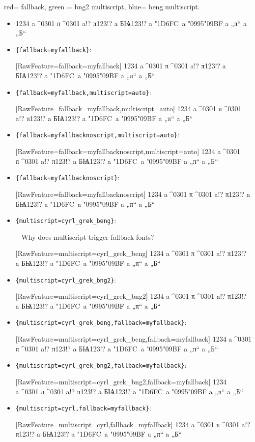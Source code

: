 \documentclass{article}
\newcommand\testtext{1234 a^^^^0301 π^^^^0301 a!? π123!? a БѨ123!? a \char"1D6FC\ a \char"0995\char"09BF a „π“ a „Б“}
\begin{document}
red= fallback, green = bng2 multiscript, blue= beng multiscript.

\begin{itemize}
\item \testtext

\item \verb+{fallback=myfallback}+:

[RawFeature={fallback=myfallback}]
\testtext

\item \verb+{fallback=myfallback,multiscript=auto}+:

[RawFeature={fallback=myfallback,multiscript=auto}]
\testtext


\item \verb+{fallback=myfallbacknoscript,multiscript=auto}+:

[RawFeature={fallback=myfallbacknoscript,multiscript=auto}]
\testtext

\item \verb+{fallback=myfallbacknoscript}+:

[RawFeature={fallback=myfallbacknoscript}]
\testtext

\item \verb+{multiscript=cyrl_grek_beng}+:

-- Why does multiscript trigger fallback fonts?

[RawFeature={multiscript=cyrl_grek_beng}]
\testtext

\item \verb+{multiscript=cyrl_grek_bng2}+:

[RawFeature={multiscript=cyrl_grek_bng2}]
\testtext

\item \verb+{multiscript=cyrl_grek_beng,fallback=myfallback}+:

[RawFeature={multiscript=cyrl_grek_beng,fallback=myfallback}]
\testtext

\item \verb+{multiscript=cyrl_grek_bng2,fallback=myfallback}+:

[RawFeature={multiscript=cyrl_grek_bng2,fallback=myfallback}]
\testtext

\item \verb+{multiscript=cyrl,fallback=myfallback}+:

[RawFeature={multiscript=cyrl,fallback=myfallback}]
\testtext


\end{itemize}
\end{document}
